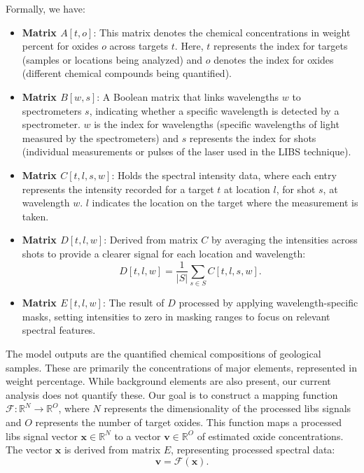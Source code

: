 Formally, we have:

\begin{itemize}
    \item \textbf{Matrix $A[t, o]$}: This matrix denotes the chemical concentrations in weight percent for oxides $o$ across targets $t$. Here, $t$ represents the index for targets (samples or locations being analyzed) and $o$ denotes the index for oxides (different chemical compounds being quantified).
    \item \textbf{Matrix $B[w, s]$}: A Boolean matrix that links wavelengths $w$ to spectrometers $s$, indicating whether a specific wavelength is detected by a spectrometer. $w$ is the index for wavelengths (specific wavelengths of light measured by the spectrometers) and $s$ represents the index for shots (individual measurements or pulses of the laser used in the LIBS technique).
    \item \textbf{Matrix $C[t, l, s, w]$}: Holds the spectral intensity data, where each entry represents the intensity recorded for a target $t$ at location $l$, for shot $s$, at wavelength $w$. $l$ indicates the location on the target where the measurement is taken.
    \item \textbf{Matrix $D[t, l, w]$}: Derived from matrix $C$ by averaging the intensities across shots to provide a clearer signal for each location and wavelength:
    \[
    D[t, l, w] = \frac{1}{|S|} \sum_{s \in S} C[t, l, s, w].
    \]
    \item \textbf{Matrix $E[t, l, w]$}: The result of $D$ processed by applying wavelength-specific masks, setting intensities to zero in masking ranges to focus on relevant spectral features.
\end{itemize}

The model outputs are the quantified chemical compositions of geological samples. These are primarily the concentrations of major elements, represented in weight percentage. While background elements are also present, our current analysis does not quantify these.
Our goal is to construct a mapping function $\mathcal{F}: \mathbb{R}^N \rightarrow \mathbb{R}^O$, where $N$ represents the dimensionality of the processed \gls{libs} signals and $O$ represents the number of target oxides. This function maps a processed \gls{libs} signal vector $\mathbf{x} \in \mathbb{R}^N$ to a vector $\mathbf{v} \in \mathbb{R}^O$ of estimated oxide concentrations. The vector $\mathbf{x}$ is derived from matrix $E$, representing processed spectral data:
\[
\mathbf{v} = \mathcal{F}(\mathbf{x}).
\]

